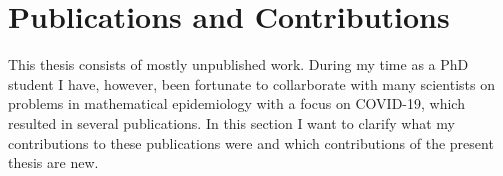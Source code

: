 
\chapter*{Publications and Contributions}

This thesis consists of mostly unpublished work. 
During my time as a PhD student I have, however, been fortunate to collarborate with many scientists on problems in mathematical epidemiology with a focus on COVID-19, which resulted in several publications.
In this section I want to clarify what my contributions to these publications were and which contributions of the present thesis are new.

\begin{refsection}[ownpubs]
    \small
    \nocite{Sherratt2022Predictive,Bracher2022National,Grundel2022How,Grundel2021How,Burgard2021Regional,Bracher2021Preregistered,Hotz2020Monitoring} 
    \printbibliography[heading=none]
\end{refsection}
